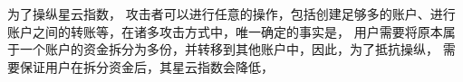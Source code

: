 \begin{comment}
当达到市场均衡时，星云币的价格满足供给量与需求量相等。此时的经济系统满足如下特性：

1. 根据市场结清理论（market clearing），$e_t$是当需求小于供给时的最低汇率:

\begin{align}
\label{etfunc}
e_t=min\{e:Q_t(e;x_t)\leq\bar{B} e \}
\end{align}

2. 根据理性预期理论(rational expectations),在时刻$t$，参与者会充分利用所得信息来预期下一阶段的汇率分布$G_{t+1}$，并且该预期可被认为是合理正确的,这里用$\mu_{it}$表示用户$i$的理性预期。
\begin{align}
\label{me_func}
\mu_{it}=G_{t+1}
\end{align}



定理: 存在且唯一的汇率$e^{*}(x_t)$使得供需达到平衡.


证明：

首先在某个时刻$t>\hat{t}$,假设存在所有用户都选择使用星云币发起交易，我们可以找到满足此情况的一个充分必要条件：
\begin{align}
\mathbb{E}v(\frac{\widetilde{Z}}{N})-c^+>u(\widehat{T};1)
\end{align}

其中$\widetilde{Z}$是服从二项分布$Bi(N,p)$的随机变量。



汇率$e_t$则会趋近于：

\begin{align}
e_t=\sum_i x_{i,t} / \bar{B}
\end{align}

此时收益函数可以表示为：
\begin{align}
u(T;1,e,\kappa_t,c_i)=\kappa_t \cdot \mathbb{E}_{it}v(\frac{\widetilde{e}_{t+1}}{e})-c_i\geq \kappa_t \mathbb{E}_{it}v(\frac{\widetilde{e}_{t+1}}{N/\bar{B}})-c^+
\approx \kappa_t \mathbb{E}v(\frac{\widetilde{Z}}{N})-c^+>u(\widehat{T};1)
\end{align}

即此时对于所有参与者，使用星云币交易为最优选择。

根据上文，$G_{t+1}$表示$\widetilde{e}_{t+1}$的分布，在$\hat{t}$时刻，所有用户参与并使用星云币进行交易，因此$\widetilde{e}_{\hat{t}+1}$已知并且近似于$\widetilde{Z}/\bar{B}$的分布，即已知$G_{t+1}$，同理可以推出已知$G_t$。基于理性预期，市场需求可以根据公式\eqref{demandfunc}对每个用户累加求和得出。公式\eqref{demandfunc}为连续函数，且当$e$从0逐渐增大时，$Q_t(e;x_t)$从$\sum_ix_{it}$减少到趋近于0.这意味着，一定存在某个$e_t$满足公式\eqref{etfunc},即存在汇率$e_t$满足供需平衡。
$\square$


\end{comment}



为了操纵星云指数，
攻击者可以进行任意的操作，包括创建足够多的账户、进行账户之间的转账等，在诸多攻击方式中，唯一确定的事实是，
{\color{red} 用户需要将原本属于一个账户的资金拆分为多份，并转移到其他账户中}，因此，为了抵抗操纵，
需要保证用户在拆分资金后，其星云指数会降低，
